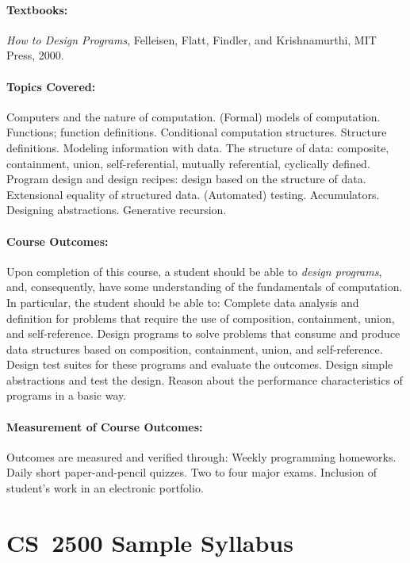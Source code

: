 \documentclass[11pt]{article}
\begin{document}
\paragraph{Textbooks:}
%
\emph{How to Design Programs}, Felleisen, Flatt, Findler, and Krishnamurthi, 
MIT Press, 2000.

\paragraph{Topics Covered:}
%
Computers and the nature of computation. (Formal) models of computation.
Functions; function definitions. Conditional computation structures. Structure
definitions. Modeling information with data. The structure of data:
composite, containment, union, self-referential, mutually referential,
cyclically defined. Program design and design recipes: design based on the
structure of data. Extensional equality of structured data. (Automated) testing.
Accumulators. Designing abstractions. Generative recursion.

\paragraph{Course Outcomes:}
%
Upon completion of this course, a student should be able to \emph{design programs},
and, consequently, have some understanding of the fundamentals of computation.
In particular, the student should be able to: Complete data analysis and
definition for problems that require the use of composition, containment,
union, and self-reference. Design programs to solve problems that consume and
produce data structures based on composition, containment, union, and
self-reference. Design test suites for these programs and evaluate the
outcomes. Design simple abstractions and test the design. Reason about the
performance characteristics of programs in a basic way.

\paragraph{Measurement of Course Outcomes:}
%
Outcomes are measured and verified through: Weekly programming homeworks.
Daily short paper-and-pencil quizzes. Two to four major exams. Inclusion of
student's work in an electronic portfolio.

\pagebreak

\section*{CS~2500 Sample Syllabus}
\end{document}
